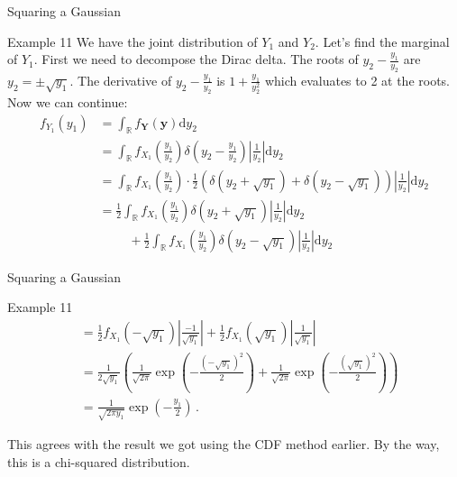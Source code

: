 \documentclass[10pt]{beamer}
\begin{document}
\begin{frame}[fragile]{Squaring a Gaussian}
\begin{exampleblock}{Example 11}
We have the joint distribution of \(Y_1\) and \(Y_2\). Let's find the marginal of \(Y_1\). First we need to decompose the Dirac delta. The roots of \(y_2 - \frac{y_1}{y_2}\) are \(y_2 = \pm \sqrt{y_1}\). The derivative of \(y_2 - \frac{y_1}{y_2}\) is \(1 + \frac{y_1}{y_2^2}\) which evaluates to 2 at the roots. Now we can continue:
\begin{equation*}
    \begin{aligned}
        f_{Y_1}\left(y_1\right) &= \int_{\mathbb{R}}f_{\bm{Y}}\left(\bm{y}\right)\mathrm{d}y_2\\
        &= \int_{\mathbb{R}}f_{X_1}\left(\frac{y_1}{y_2}\right)\delta\left(y_2 - \frac{y_1}{y_2}\right)\left|\frac{1}{y_2}\right|\mathrm{d}y_2\\
        &= \int_{\mathbb{R}}f_{X_1}\left(\frac{y_1}{y_2}\right)\cdot\frac{1}{2}\left(\delta\left(y_2 + \sqrt{y_1}\right) + \delta\left(y_2 - \sqrt{y_1}\right)\right)\left|\frac{1}{y_2}\right|\mathrm{d}y_2\\
        &= \frac{1}{2}\int_{\mathbb{R}}f_{X_1}\left(\frac{y_1}{y_2}\right)\delta\left(y_2 + \sqrt{y_1}\right)\left|\frac{1}{y_2}\right|\mathrm{d}y_2\\
        &\phantom{=}\quad + \frac{1}{2}\int_{\mathbb{R}}f_{X_1}\left(\frac{y_1}{y_2}\right)\delta\left(y_2 - \sqrt{y_1}\right)\left|\frac{1}{y_2}\right|\mathrm{d}y_2
    \end{aligned}
\end{equation*}
\end{exampleblock}
\end{frame}

\begin{frame}[fragile]{Squaring a Gaussian}
\begin{exampleblock}{Example 11}
\begin{equation*}
    \begin{aligned}
        &= \frac{1}{2}f_{X_1}\left(-\sqrt{y_1}\right)\left|\frac{-1}{\sqrt{y_1}}\right| + \frac{1}{2}f_{X_1}\left(\sqrt{y_1}\right)\left|\frac{1}{\sqrt{y_1}}\right|\\
        &= \frac{1}{2\sqrt{y_1}}\left(\frac{1}{\sqrt{2\pi}}\exp\left(-\frac{\left(-\sqrt{y_1}\right)^2}{2}\right) + \frac{1}{\sqrt{2\pi}}\exp\left(-\frac{\left(\sqrt{y_1}\right)^2}{2}\right)\right)\\
        &= \frac{1}{\sqrt{2\pi y_1}}\exp\left(-\frac{y_1}{2}\right)\,.
    \end{aligned}
\end{equation*}
\end{exampleblock}

This agrees with the result we got using the CDF method earlier. By the way, this is a chi-squared distribution.
\end{frame}
\end{document}
